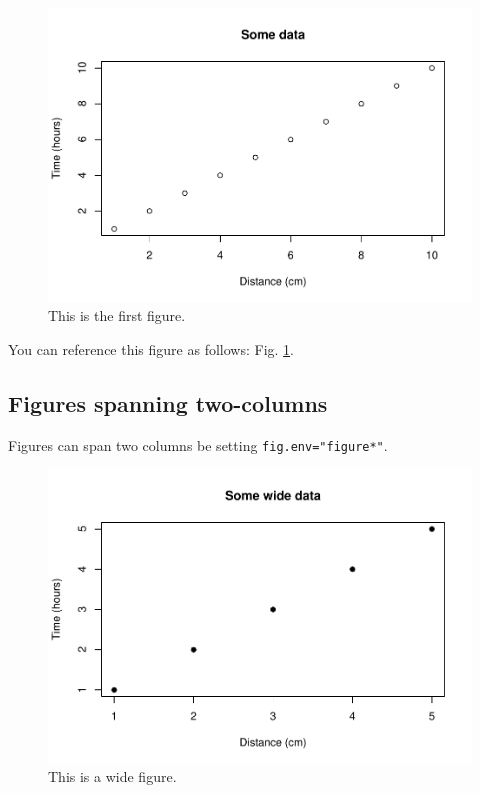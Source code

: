 \documentclass[webpdf,large,modern,namedate]{oup-authoring-template}
\theoremstyle{thmstyleone}
\theoremstyle{thmstyletwo}
\theoremstyle{thmstylethree}
\begin{document}
\begin{figure}[th]
\includegraphics[width=1\linewidth]{Seatgeek_files/figure-latex/fig1-1} \caption{This is the first figure.}\label{fig:fig1}
\end{figure}

You can reference this figure as follows: Fig. \ref{fig:fig1}.

\hypertarget{figures-spanning-two-columns}{%
\subsection{Figures spanning
two-columns}\label{figures-spanning-two-columns}}

Figures can span two columns be setting \texttt{fig.env="figure*"}.

\begin{figure}[th]
\includegraphics[width=1\linewidth]{Seatgeek_files/figure-latex/fig2-1} \caption{This is a wide figure.}\label{fig:fig2}
\end{figure}
\end{document}
